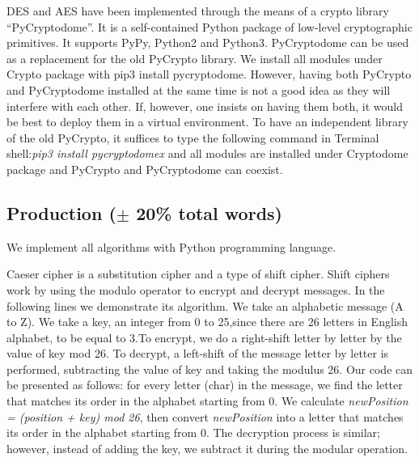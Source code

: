 DES and AES have been implemented through the means of a crypto library “PyCryptodome”. It is a self-contained Python package of low-level cryptographic primitives. It supports PyPy, Python2 and Python3. PyCryptodome can be used as a replacement for the old PyCrypto library. We install all modules under Crypto package with pip3 install pycryptodome.  However, having both PyCrypto and PyCryptodome installed at the same time is not a good idea as they will interfere with each other. If, however, one insists on having them both, it would be best to deploy them in a virtual environment. To have an independent library of the old PyCrypto, it suffices to type the following command in Terminal shell:\textit{pip3 install pycryptodomex} and all modules are installed under Cryptodome package and PyCrypto and PyCryptodome can coexist. 


\subsection{Production ($\pm$ 20\% total words)}

We implement all algorithms with Python programming language. 

Caeser cipher is a substitution cipher and a type of shift cipher. Shift ciphers work by using the modulo operator to encrypt and decrypt messages. In the following lines we demonstrate its algorithm. We take an alphabetic message (A to Z). We take a key, an integer from 0 to 25,since there are 26 letters in English alphabet, to be equal to 3.To encrypt, we do a right-shift letter by letter by the value of key mod 26. To decrypt, a left-shift of the message letter by letter is performed, subtracting the value of key and taking the modulus 26. Our code can be presented as follows: for every letter (char) in the message, we find the letter that matches its order in the alphabet starting from 0. We calculate \textit{newPosition = (position + key) mod 26}, then convert \textit{newPosition} into a letter that matches its order in the alphabet starting from 0. The decryption process is similar; however, instead of adding the key, we subtract it during the modular operation.

